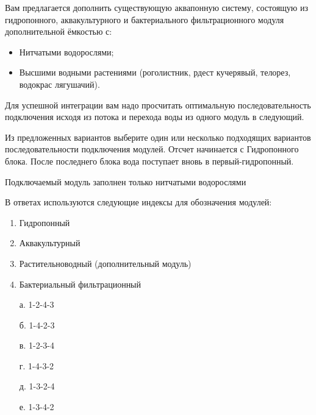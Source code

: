 
Вам предлагается дополнить существующую аквапонную систему, состоящую из гидропонного, аквакультурного и бактериального фильтрационного модуля дополнительной ёмкостью с:

\begin{itemize}
    \item Нитчатыми водорослями;
    \item Высшими водными растениями (роголистник, рдест кучерявый, телорез, водокрас лягушачий).
\end{itemize}

Для успешной интеграции вам надо просчитать оптимальную последовательность подключения исходя из потока и перехода воды из одного модуль в следующий.

Из предложенных вариантов выберите один или несколько подходящих вариантов последовательности подключения модулей. Отсчет начинается с Гидропонного блока. После последнего блока вода поступает вновь в первый-гидропонный.

Подключаемый модуль заполнен только нитчатыми водорослями

В ответах используются следующие индексы для обозначения модулей:

\begin{enumerate}
    \item Гидропонный
    \item Аквакультурный
    \item Растительноводный (дополнительный модуль)
    \item Бактериальный фильтрационный
\end{enumerate}

\begin{enumerate}
    \item[а.] 1-2-4-3
    \item[б.] 1-4-2-3
    \item[в.] 1-2-3-4
    \item[г.] 1-4-3-2
    \item[д.] 1-3-2-4
    \item[е.] 1-3-4-2
\end{enumerate}

